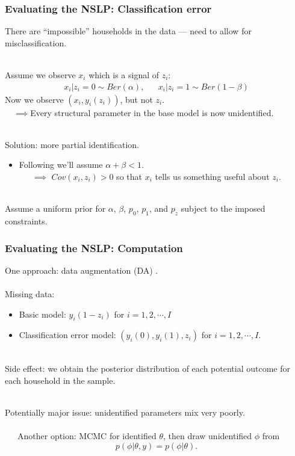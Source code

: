 \documentclass[xcolor=dvipsnames]{beamer}
\begin{document}
\begin{frame}
  \frametitle{Evaluating the NSLP: Classification error}
There are ``impossible'' households in the data --- need to allow for misclassification.\\~

\pause Assume we observe $x_i$ which is a signal of $z_i$:
\begin{align*}
  x_i|z_i=0 \sim Ber(\alpha),&&  x_i|z_i=1 \sim Ber(1-\beta)
\end{align*}
\pause Now we observe $(x_i,y_i(z_i))$, but not $z_i$.\\
\ \ $\implies$Every structural parameter in the base model is now unidentified. \\~

\pause Solution: more partial identification.
\pause \begin{itemize}
\item[] Following \cite{bollinger2009bayesian} we'll assume $\alpha + \beta <1$.\\
\ \ \ $\implies$ $Cov(x_i,z_i)>0$ so that $x_i$ tells us something useful about $z_i$.\\~\\
\end{itemize}


\pause Assume a uniform prior for $\alpha$, $\beta$, $p_0$, $p_1$, and $p_z$ subject to the imposed constraints.
\end{frame}


\begin{frame}
\frametitle{Evaluating the NSLP: Computation}
One approach: data augmentation (DA) \citep{tanner1987calculation}.\\~\\

Missing data:
\begin{itemize}
\item Basic model: $y_i(1-z_i)$ for $i=1,2,\cdots,I$
\item Classification error model: $(y_i(0), y_i(1), z_i)$ for $i=1,2, \cdots,I$.\\~
\end{itemize}

\pause Side effect: we obtain the posterior distribution of each potential outcome for each household in the sample.\\~

\pause Potentially major issue: unidentified parameters mix very poorly. \\~\\
\ \ \ Another option: MCMC for identified $\theta$, then draw unidentified $\phi$ from
\[
p(\phi|\theta,y)=p(\phi|\theta).
\]
\end{frame}
\end{document}
